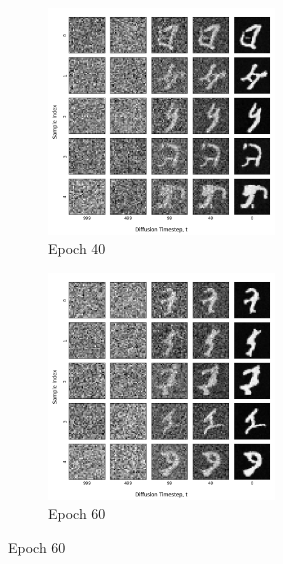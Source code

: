 \documentclass[12pt]{article}
\begin{document}
\begin{figure}[hp]
    \begin{subfigure}{0.49\textwidth}
    \includegraphics[width=0.9\linewidth, height=6cm, center]{figures/diffusion_plot_1_0040.png}
    \caption{Epoch 40}
    \label{fig:1_40}
    \end{subfigure}
    \begin{subfigure}{0.49\textwidth}
    \includegraphics[width=0.9\linewidth, height=6cm, center]{figures/diffusion_plot_1_0060.png}
    \caption{Epoch 60}
    \label{fig:1_60}
    \end{subfigure}


\end{figure}
\end{document}
